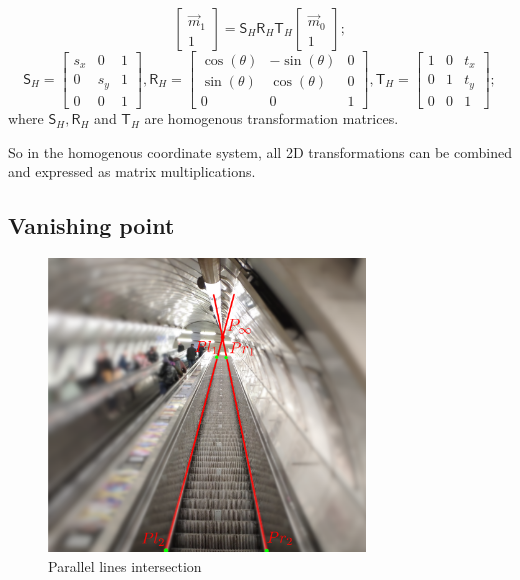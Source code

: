 \begin{equation}
    \begin{bmatrix} \vec{m}_1 \\ 1 \end{bmatrix} = 
    \pmb{\mathsf{S}}_H \pmb{\mathsf{R}}_H \pmb{\mathsf{T}}_H
    \begin{bmatrix} \vec{m}_0 \\ 1 \end{bmatrix} ;
\end{equation}
\begin{equation}
    \pmb{\mathsf{S}}_H = \begin{bmatrix} s_x & 0 & 1\\ 0 & s_y & 1 \\ 0 & 0 & 1\end{bmatrix}, \pmb{\mathsf{R}}_H = \begin{bmatrix} \cos(\theta) & -\sin(\theta) & 0 \\ \sin(\theta) & \cos(\theta) & 0 \\ 0 & 0 & 1 \end{bmatrix}, \pmb{\mathsf{T}}_H = \begin{bmatrix} 1 & 0 & t_x\\ 0 & 1 & t_y \\ 0 & 0 & 1 \end{bmatrix} ;
\end{equation}
where $\pmb{\mathsf{S}}_H, \pmb{\mathsf{R}}_H$ and $\pmb{\mathsf{T}}_H$ are homogenous transformation matrices.

So in the homogenous coordinate system, all 2D transformations can be combined and expressed as matrix multiplications.

\subsection{Vanishing point}
\begin{figure}[h]
    \centering
    \includegraphics[width=0.75\textwidth]{graphics/parallel_intersection.png}
    \caption{Parallel lines intersection}
    \label{fig:intersection_parallel}
\end{figure}

